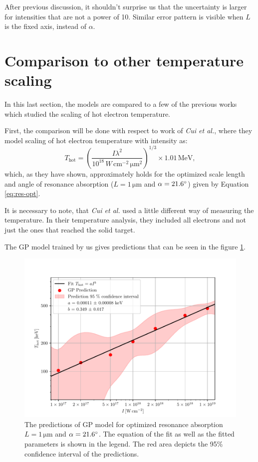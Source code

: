 After previous discussion, it shouldn't surprise us that the uncertainty is larger for intensities that are not a power of 10. Similar error pattern is visible when $L$ is the fixed axis, instead of $\alpha$.


\newpage
\section{Comparison to other temperature scaling}
\label{ch:comparison}
In this last section, the models are compared to a few of the previous works which studied the scaling of hot electron temperature.

First, the comparison will be done with respect to work of \textit{Cui et al.}\cite{cui2013}, where they model scaling of hot electron temperature with intensity as: 
\begin{equation}
	\label{eq:cui-scale}
	T_{\mathrm{hot}} = \left(\frac{I\lambda^2}{10^{18} \, W \, \mathrm{cm}^{-2} \, \mathrm{\mu m}^2}\right)^{1/3} \times 1.01 \, \mathrm{MeV},
\end{equation}
which, as they have shown, approximately holds for the optimized scale length and angle of resonance absorption ($L = 1 \, \mathrm{\mu m}$ and $\alpha = 21.6 \degree$) given by Equation \ref{eq:res-opt}.

It is necessary to note, that \textit{Cui et al.} used a little different way of measuring the temperature. In their temperature analysis, they included all electrons and not just the ones that reached the solid target.

The GP model trained by us gives predictions that can be seen in the figure \ref{fig:cui-compare-1}.

\begin{figure}[h]
	\centering
	\includegraphics[width=0.95 \textwidth]{figures/cui_compare1}
	\caption{The predictions of GP model for optimized resonance absorption $L = 1 \, \mathrm{\mu m}$ and $\alpha = 21.6 \degree$. The equation of the fit as well as the fitted parameters is shown in the legend. The red area depicts the 95\% confidence interval of the predictions.}
	\label{fig:cui-compare-1}
\end{figure}

